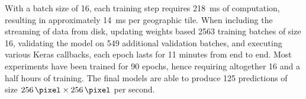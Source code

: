 \begin{wrapfigure}[8]{r}{.4\textwidth}
  \vspace{-0.5\baselineskip}
\end{wrapfigure}

With a batch size of 16, each training step requires \SI{218}{\milli\second} of computation, resulting in approximately \SI{14}{\milli\second} per geographic tile.
When including the streaming of data from disk, updating weights based \num{2563} training batches of size 16, validating the model on \num{549} additional validation batches, and executing various Keras callbacks, each epoch lasts for 11 minutes from end to end.
Most experiments have been trained for 90 epochs, hence requiring altogether 16 and a half hours of training.
The final models are able to produce 125 predictions of size $\SI{256}{\pixel} \times \SI{256}{\pixel}$ per second.
